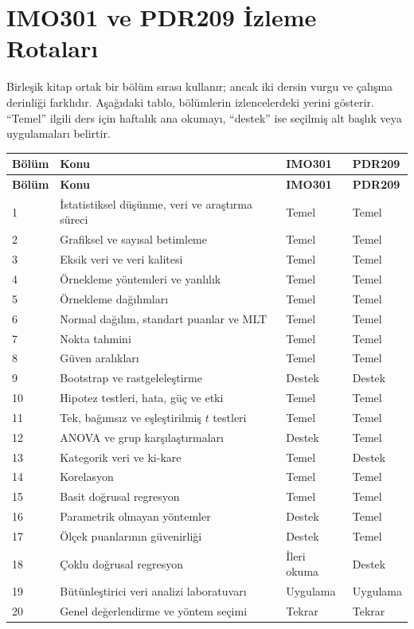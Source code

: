 \chapter*{IMO301 ve PDR209 İzleme Rotaları}

Birleşik kitap ortak bir bölüm sırası kullanır; ancak iki dersin vurgu ve
çalışma derinliği farklıdır. Aşağıdaki tablo, bölümlerin izlencelerdeki
yerini gösterir. ``Temel'' ilgili ders için haftalık ana okumayı, ``destek''
ise seçilmiş alt başlık veya uygulamaları belirtir.

\small
\begin{longtable}{@{}p{}p{}p{}p{}@{}}
\toprule
\textbf{Bölüm} & \textbf{Konu} & \textbf{IMO301} & \textbf{PDR209} \\
\midrule
\endfirsthead
\toprule
\textbf{Bölüm} & \textbf{Konu} & \textbf{IMO301} & \textbf{PDR209} \\
\midrule
\endhead
1 & İstatistiksel düşünme, veri ve araştırma süreci & Temel & Temel \\
2 & Grafiksel ve sayısal betimleme & Temel & Temel \\
3 & Eksik veri ve veri kalitesi & Temel & Temel \\
4 & Örnekleme yöntemleri ve yanlılık & Temel & Temel \\
5 & Örnekleme dağılımları & Temel & Temel \\
6 & Normal dağılım, standart puanlar ve MLT & Temel & Temel \\
7 & Nokta tahmini & Temel & Temel \\
8 & Güven aralıkları & Temel & Temel \\
9 & Bootstrap ve rastgeleleştirme & Destek & Destek \\
10 & Hipotez testleri, hata, güç ve etki & Temel & Temel \\
11 & Tek, bağımsız ve eşleştirilmiş $t$ testleri & Temel & Temel \\
12 & ANOVA ve grup karşılaştırmaları & Destek & Temel \\
13 & Kategorik veri ve ki-kare & Temel & Destek \\
14 & Korelasyon & Temel & Temel \\
15 & Basit doğrusal regresyon & Temel & Temel \\
16 & Parametrik olmayan yöntemler & Destek & Temel \\
17 & Ölçek puanlarının güvenirliği & Destek & Temel \\
18 & Çoklu doğrusal regresyon & İleri okuma & Destek \\
19 & Bütünleştirici veri analizi laboratuvarı & Uygulama & Uygulama \\
20 & Genel değerlendirme ve yöntem seçimi & Tekrar & Tekrar \\
\bottomrule
\end{longtable}
\normalsize

